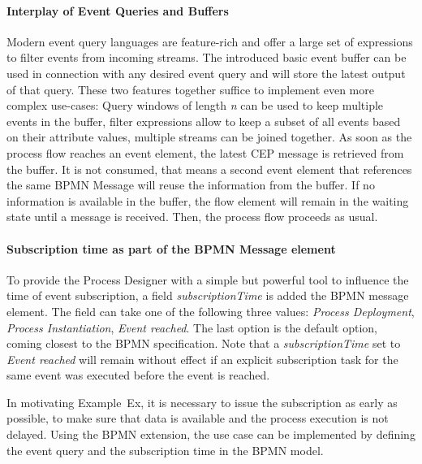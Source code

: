 \paragraph{Interplay of Event Queries and Buffers}
Modern event query languages are feature-rich and offer a large set of expressions to filter events from incoming streams. 
The introduced basic event buffer can be used in connection with any desired event query and will store the latest output of that query.
These two features together suffice to implement even more complex use-cases: Query windows of length \textit{n} can be used to keep multiple events in the buffer, filter expressions allow to keep a subset of all events based on their attribute values, multiple streams can be joined together.
As soon as the process flow reaches an event element, the latest CEP message is retrieved from the buffer. It is not consumed, that means a second event element that references the same BPMN Message will reuse the information from the buffer.
If no information is available in the buffer, the flow element will remain in the waiting state until a message is received. Then, the process flow proceeds as usual.


\paragraph{Subscription time as part of the BPMN Message element\newline}
To provide the Process Designer with a simple but powerful tool to influence the time of event subscription, a field \textit{subscriptionTime} is added the BPMN message element. 
The field can take one of the following three values: \textit{Process Deployment}, \textit{Process Instantiation}, \textit{Event reached}. The last option is the default option, coming closest to the BPMN specification.
Note that a \textit{subscriptionTime} set to \textit{Event reached} will remain without effect if an explicit subscription task for the same event was executed before the event is reached.


In motivating Example~Ex, it is necessary to issue the subscription as early as possible, to make sure that data is available and the process execution is not delayed. 
Using the BPMN extension, the use case can be implemented by defining the event query and the subscription time in the BPMN model. 

